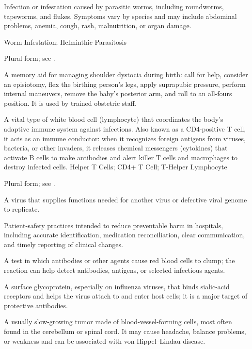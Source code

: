  Infection or infestation caused by parasitic worms, including roundworms, tapeworms, and flukes. Symptoms vary by species and may include abdominal problems, anemia, cough, rash, malnutrition, or organ damage.

\synonyms
Worm Infestation; Helminthic Parasitosis

 Plural form; see .

 A memory aid for managing shoulder dystocia during birth: call for help, consider an episiotomy, flex the birthing person’s legs, apply suprapubic pressure, perform internal maneuvers, remove the baby’s posterior arm, and roll to an all-fours position. It is used by trained obstetric staff.

 A vital type of white blood cell (lymphocyte) that coordinates the body's adaptive immune system against infections. Also known as a CD4-positive T cell, it acts as an immune conductor: when it recognizes foreign antigens from viruses, bacteria, or other invaders, it releases chemical messengers (cytokines) that activate B cells to make antibodies and alert killer T cells and macrophages to destroy infected cells.
\synonyms
Helper T Cells; CD4+ T Cell; T-Helper Lymphocyte

 Plural form; see .

 A virus that supplies functions needed for another virus or defective viral genome to replicate.

 Patient-safety practices intended to reduce preventable harm in hospitals, including accurate identification, medication reconciliation, clear communication, and timely reporting of clinical changes.

 A test in which antibodies or other agents cause red blood cells to clump; the reaction can help detect antibodies, antigens, or selected infectious agents.

 A surface glycoprotein, especially on influenza viruses, that binds sialic-acid receptors and helps the virus attach to and enter host cells; it is a major target of protective antibodies.

 A usually slow-growing tumor made of blood-vessel-forming cells, most often found in the cerebellum or spinal cord. It may cause headache, balance problems, or weakness and can be associated with von Hippel–Lindau disease.

